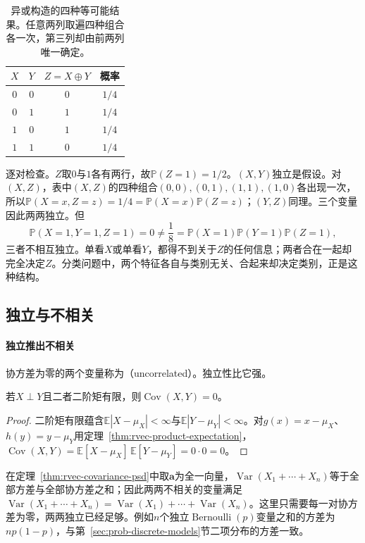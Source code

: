 \begin{table}[htbp]
  \centering
  \caption{异或构造的四种等可能结果。任意两列取遍四种组合各一次，第三列却由前两列唯一确定。}
  \label{tab:rvec-xor}
  \begin{tabular}{cccc}
    \toprule
    $X$ & $Y$ & $Z=X\oplus Y$ & 概率\\
    \midrule
    $0$ & $0$ & $0$ & $1/4$\\
    $0$ & $1$ & $1$ & $1/4$\\
    $1$ & $0$ & $1$ & $1/4$\\
    $1$ & $1$ & $0$ & $1/4$\\
    \bottomrule
  \end{tabular}
\end{table}

逐对检查。$Z$取$0$与$1$各有两行，故$\mathbb P(Z=1)=1/2$。$(X,Y)$独立是假设。对$(X,Z)$，表中$(X,Z)$的四种组合$(0,0),(0,1),(1,1),(1,0)$各出现一次，所以$\mathbb P(X=x,Z=z)=1/4=\mathbb P(X=x)\mathbb P(Z=z)$；$(Y,Z)$同理。三个变量因此两两独立。但
\[
 \mathbb P(X=1,Y=1,Z=1)=0\neq\frac18=\mathbb P(X=1)\mathbb P(Y=1)\mathbb P(Z=1),
\]
三者不相互独立。单看$X$或单看$Y$，都得不到关于$Z$的任何信息；两者合在一起却完全决定$Z$。分类问题中，两个特征各自与类别无关、合起来却决定类别，正是这种结构。

\subsection{独立与不相关}

\paragraph{独立推出不相关}
协方差为零的两个变量称为（uncorrelated）。独立性比它强。

\begin{theorem}[独立变量不相关]
\label{thm:rvec-independent-uncorrelated}
若$X\perp Y$且二者二阶矩有限，则$\operatorname{Cov}(X,Y)=0$。
\end{theorem}

\begin{proof}
二阶矩有限蕴含$\mathbb E|X-\mu_X|<\infty$与$\mathbb E|Y-\mu_Y|<\infty$。对$g(x)=x-\mu_X$、$h(y)=y-\mu_Y$用定理~\ref{thm:rvec-product-expectation}，
$\operatorname{Cov}(X,Y)=\mathbb E[X-\mu_X]\,\mathbb E[Y-\mu_Y]=0\cdot0=0$。
\end{proof}

在定理~\ref{thm:rvec-covariance-psd}中取$\bm a$为全一向量，$\operatorname{Var}(X_1+\cdots+X_n)$等于全部方差与全部协方差之和；因此两两不相关的变量满足$\operatorname{Var}(X_1+\cdots+X_n)=\operatorname{Var}(X_1)+\cdots+\operatorname{Var}(X_n)$。这里只需要每一对协方差为零，两两独立已经足够。例如$n$个独立$\operatorname{Bernoulli}(p)$变量之和的方差为$np(1-p)$，与第~\ref{sec:prob-discrete-models}节二项分布的方差一致。

